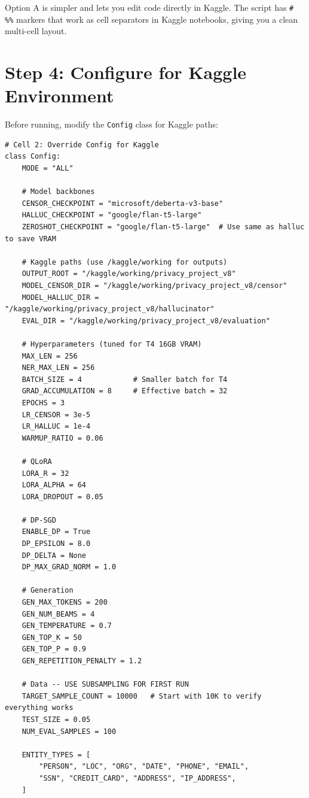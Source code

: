 \documentclass[11pt, a4paper]{article}
\begin{document}
\begin{tip}[Recommendation]
Option A is simpler and lets you edit code directly in Kaggle. The script has \texttt{\# \%\%} markers that work as cell separators in Kaggle notebooks, giving you a clean multi-cell layout.
\end{tip}

\section{Step 4: Configure for Kaggle Environment}

Before running, modify the \texttt{Config} class for Kaggle paths:

\begin{lstlisting}[style=python]
# Cell 2: Override Config for Kaggle
class Config:
    MODE = "ALL"

    # Model backbones
    CENSOR_CHECKPOINT = "microsoft/deberta-v3-base"
    HALLUC_CHECKPOINT = "google/flan-t5-large"
    ZEROSHOT_CHECKPOINT = "google/flan-t5-large"  # Use same as halluc to save VRAM

    # Kaggle paths (use /kaggle/working for outputs)
    OUTPUT_ROOT = "/kaggle/working/privacy_project_v8"
    MODEL_CENSOR_DIR = "/kaggle/working/privacy_project_v8/censor"
    MODEL_HALLUC_DIR = "/kaggle/working/privacy_project_v8/hallucinator"
    EVAL_DIR = "/kaggle/working/privacy_project_v8/evaluation"

    # Hyperparameters (tuned for T4 16GB VRAM)
    MAX_LEN = 256
    NER_MAX_LEN = 256
    BATCH_SIZE = 4            # Smaller batch for T4
    GRAD_ACCUMULATION = 8     # Effective batch = 32
    EPOCHS = 3
    LR_CENSOR = 3e-5
    LR_HALLUC = 1e-4
    WARMUP_RATIO = 0.06

    # QLoRA
    LORA_R = 32
    LORA_ALPHA = 64
    LORA_DROPOUT = 0.05

    # DP-SGD
    ENABLE_DP = True
    DP_EPSILON = 8.0
    DP_DELTA = None
    DP_MAX_GRAD_NORM = 1.0

    # Generation
    GEN_MAX_TOKENS = 200
    GEN_NUM_BEAMS = 4
    GEN_TEMPERATURE = 0.7
    GEN_TOP_K = 50
    GEN_TOP_P = 0.9
    GEN_REPETITION_PENALTY = 1.2

    # Data -- USE SUBSAMPLING FOR FIRST RUN
    TARGET_SAMPLE_COUNT = 10000   # Start with 10K to verify everything works
    TEST_SIZE = 0.05
    NUM_EVAL_SAMPLES = 100

    ENTITY_TYPES = [
        "PERSON", "LOC", "ORG", "DATE", "PHONE", "EMAIL",
        "SSN", "CREDIT_CARD", "ADDRESS", "IP_ADDRESS",
    ]
\end{lstlisting}
\end{document}
